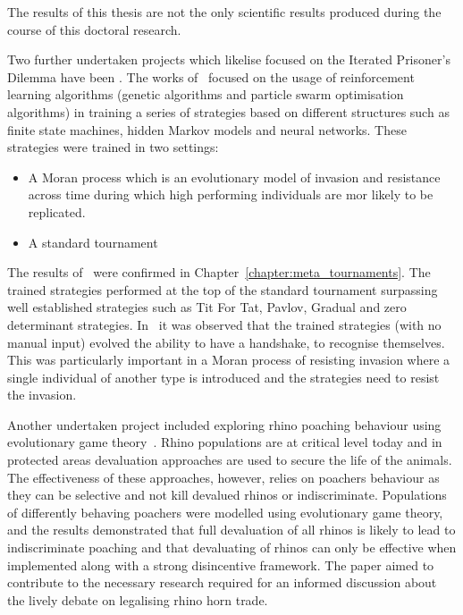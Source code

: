 The results of this thesis are not the only scientific results produced
during the course of this doctoral research.

Two further undertaken projects which likelise focused on the Iterated
Prisoner's Dilemma have been
\cite{Knight2017, Harper2017}. The works of~\cite{Knight2017, Harper2017}
focused on the usage of reinforcement learning algorithms (genetic algorithms
and particle swarm optimisation algorithms) in training a series of strategies
based on different structures such as finite state machines, hidden Markov
models and neural networks. These strategies were trained in two settings:

\begin{itemize}
    \item A Moran process which is an evolutionary model of invasion and
    resistance across time during which high performing individuals are mor
    likely to be replicated.
    \item A standard tournament
\end{itemize}

The results of~\cite{Knight2017} were confirmed in
Chapter~\ref{chapter:meta_tournaments}. The trained strategies performed at
the top of the standard tournament surpassing well established
strategies such as Tit For Tat, Pavlov, Gradual and zero determinant strategies.
In~\cite{Harper2017} it was observed that the trained strategies (with no manual
input) evolved the ability to have a handshake, to recognise themselves. This
was particularly important in a Moran process of resisting invasion where a
single individual of another type is introduced and the strategies need to
resist the invasion.

Another undertaken project included exploring rhino poaching behaviour using
evolutionary game theory~\cite{Glynatsi2018}. Rhino populations are at critical
level today and in protected areas devaluation approaches are used to secure the
life of the animals. The effectiveness of these approaches, however, relies on
poachers behaviour as they can be selective and not kill devalued rhinos or
indiscriminate. Populations of differently behaving poachers were modelled using
evolutionary game theory, and the results
demonstrated that full devaluation of all rhinos is likely to lead to
indiscriminate poaching and that devaluating of rhinos can only be effective
when implemented along with a strong disincentive framework. The paper aimed to
contribute to the necessary research required for an informed discussion about
the lively debate on legalising rhino horn trade.

